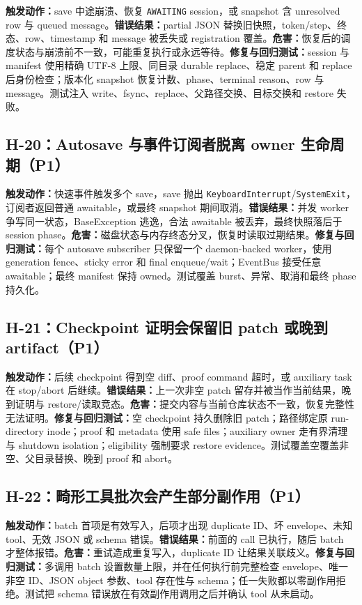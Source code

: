\documentclass[11pt,a4paper,fontset=fandol]{ctexart}
\newcommand{\code}[1]{\texttt{#1}}
\begin{document}
\textbf{触发动作：}save 中途崩溃、恢复 \code{AWAITING} session，或 snapshot 含 unresolved row 与 queued message。\textbf{错误结果：}partial JSON 替换旧快照，token/step、终态、row、timestamp 和 message 被丢失或 registration 覆盖。\textbf{危害：}恢复后的调度状态与崩溃前不一致，可能重复执行或永远等待。\textbf{修复与回归测试：}session 与 manifest 使用精确 UTF-8 上限、同目录 durable replace、稳定 parent 和 replace 后身份检查；版本化 snapshot 恢复计数、phase、terminal reason、row 与 message。测试注入 write、fsync、replace、父路径交换、目标交换和 restore 失败。

\subsection{H-20：Autosave 与事件订阅者脱离 owner 生命周期（P1）}

\textbf{触发动作：}快速事件触发多个 save，save 抛出 \code{KeyboardInterrupt}/\code{SystemExit}，订阅者返回普通 awaitable，或最终 snapshot 期间取消。\textbf{错误结果：}并发 worker 争写同一状态，BaseException 逃逸，合法 awaitable 被丢弃，最终快照落后于 session phase。\textbf{危害：}磁盘状态与内存终态分叉，恢复时读取过期结果。\textbf{修复与回归测试：}每个 autosave subscriber 只保留一个 daemon-backed worker，使用 generation fence、sticky error 和 final enqueue/wait；EventBus 接受任意 awaitable；最终 manifest 保持 owned。测试覆盖 burst、异常、取消和最终 phase 持久化。

\subsection{H-21：Checkpoint 证明会保留旧 patch 或晚到 artifact（P1）}

\textbf{触发动作：}后续 checkpoint 得到空 diff、proof command 超时，或 auxiliary task 在 stop/abort 后继续。\textbf{错误结果：}上一次非空 patch 留存并被当作当前结果，晚到证明与 restore/读取竞态。\textbf{危害：}提交内容与当前仓库状态不一致，恢复完整性无法证明。\textbf{修复与回归测试：}空 checkpoint 持久删除旧 patch；路径绑定原 run-directory inode；proof 和 metadata 使用 safe files；auxiliary owner 走有界清理与 shutdown isolation；eligibility 强制要求 restore evidence。测试覆盖空覆盖非空、父目录替换、晚到 proof 和 abort。

\subsection{H-22：畸形工具批次会产生部分副作用（P1）}

\textbf{触发动作：}batch 首项是有效写入，后项才出现 duplicate ID、坏 envelope、未知 tool、无效 JSON 或 schema 错误。\textbf{错误结果：}前面的 call 已执行，随后 batch 才整体报错。\textbf{危害：}重试造成重复写入，duplicate ID 让结果关联歧义。\textbf{修复与回归测试：}多调用 batch 设置数量上限，并在任何执行前完整检查 envelope、唯一非空 ID、JSON object 参数、tool 存在性与 schema；任一失败都以零副作用拒绝。测试把 schema 错误放在有效副作用调用之后并确认 tool 从未启动。
\end{document}
